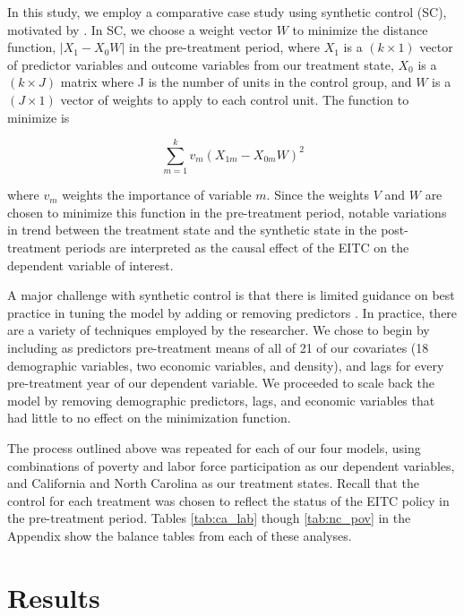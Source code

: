 \documentclass{article}
\begin{document}
In this study, we employ a comparative case study using synthetic control (SC), motivated by \cite{abadie2010synthetic}. In SC, we choose a weight vector $W$ to minimize the distance function, $\left \lvert X_{1} - X_{0}W \right \lvert $ in the pre-treatment period, where $X_{1}$ is a $(k \times 1)$ vector of predictor variables and outcome variables from our treatment state, $X_{0}$ is a $(k \times J)$ matrix where J is the number of units in the control group, and $W$ is a $(J \times 1)$ vector of weights to apply to each control unit. The function to minimize is 

\[ \sum_{m=1}^{k} v_{m}(X_{1m} - X_{0m} W)^{2} \]

where $v_{m}$ weights the importance of variable $m$. Since the weights $V$ and $W$ are chosen to minimize this function in the pre-treatment period, notable variations in trend between the treatment state and the synthetic state in the post-treatment periods are interpreted as the causal effect of the EITC on the dependent variable of interest. 

A major challenge with synthetic control is that there is limited guidance on best practice in tuning the model by adding or removing predictors \cite{ferman2020cherry}. In practice, there are a variety of techniques employed by the researcher. We chose to begin by including as predictors pre-treatment means of all of 21 of our covariates (18 demographic variables, two economic variables, and density), and lags for every pre-treatment year of our dependent variable. We proceeded to scale back the model by removing demographic predictors, lags, and economic variables that had little to no effect on the minimization function. 

The process outlined above was repeated for each of our four models, using combinations of poverty and labor force participation as our dependent variables, and California and North Carolina as our treatment states. Recall that the control for each treatment was chosen to reflect the status of the EITC policy in the pre-treatment period. Tables \ref{tab:ca_lab} though \ref{tab:nc_pov} in the Appendix show the balance tables from each of these analyses.


\section{Results}
\end{document}
